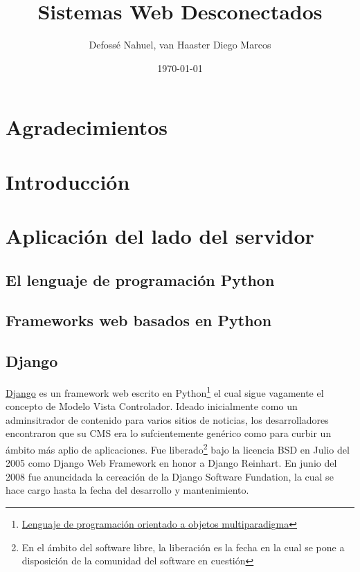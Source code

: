 \documentclass[a4paper]{report}
\begin{document}
\title{Sistemas Web Desconectados}
\author{Defossé Nahuel, van Haaster Diego Marcos}
\date{\today}

\maketitle

\tableofcontents
\listoffigures
\listoftables

\chapter*{Agradecimientos}

\begin{abstract}

\end{abstract}


\chapter{Introducción}
\label{ch:intro}

\chapter{Aplicación del lado del servidor}
\section{El lenguaje de programación Python}

\section{Frameworks web basados en Python}

\section{Django}
\href{http://www.djangoproject.com}{Django} es un framework web escrito en
Python\footnote{\href{http://www.python.org/}{Lenguaje de programación
orientado a objetos multiparadigma}} el cual sigue vagamente el concepto de Modelo Vista
Controlador. Ideado inicialmente como un adminsitrador de contenido para varios sitios de noticias, los desarrolladores encontraron que su CMS era lo sufcientemente genérico como
para curbir un ámbito más aplio de aplicaciones. Fue liberado\footnote{En el
ámbito del software libre, la liberación es la fecha en la cual se pone a
disposición de la comunidad del software en cuestión} bajo la licencia BSD en
Julio del 2005 como Django Web Framework en honor a Django Reinhart. En junio del
2008 fue anuncidada la cereación de la Django Software Fundation, la cual se hace
cargo hasta la fecha del desarrollo y mantenimiento.
\end{document}
